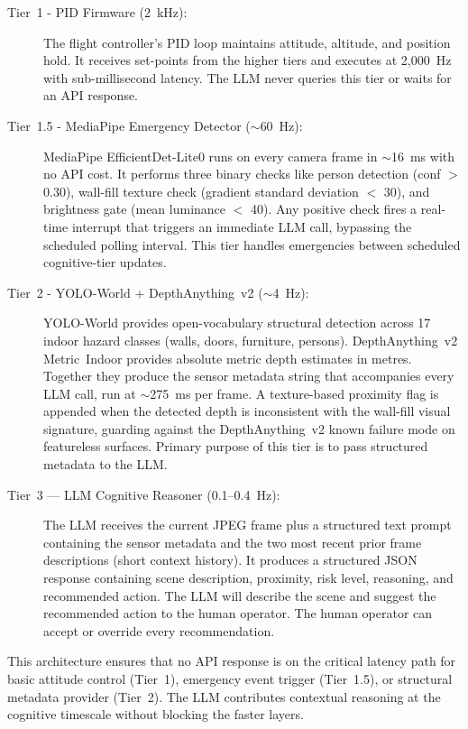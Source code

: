 \begin{description}
  \item[Tier~1 - PID Firmware (2~kHz):]
    The flight controller's PID loop maintains attitude, altitude, and position hold. 
    It receives set-points from the higher tiers and executes at 2,000~Hz with sub-millisecond latency. 
    The LLM never queries this tier or waits for an API response.
    \newpage
  \item[Tier~1.5 - MediaPipe Emergency Detector ($\sim$60~Hz):]
    MediaPipe EfficientDet-Lite0 \cite{tan2020efficientdet, lugaresi2019mediapipe} runs on every camera frame in $\sim$16~ms with no API cost. 
    It performs three binary checks like person detection (conf $>$ 0.30), wall-fill texture check (gradient standard deviation $<$ 30), and brightness gate (mean luminance $<$ 40). 
    Any positive check fires a real-time interrupt that triggers an immediate LLM call, bypassing the scheduled polling interval.
    This tier handles emergencies between scheduled cognitive-tier updates.
  \item[Tier~2 - YOLO-World + DepthAnything~v2 ($\sim$4~Hz):]
    YOLO-World \cite{cheng2024yoloworld} provides open-vocabulary structural detection across 17 indoor hazard classes (walls, doors, furniture, persons). 
    DepthAnything~v2 Metric~Indoor \cite{yang2024depthanythingv2}
    provides absolute metric depth estimates in metres. Together they produce the sensor metadata string that accompanies every LLM call, run at $\sim$275~ms per frame. 
    A texture-based proximity flag is appended when the detected depth is inconsistent with the wall-fill visual signature, guarding against the DepthAnything~v2 known failure mode on featureless surfaces.
    Primary purpose of this tier is to pass structured metadata to the LLM.
  \item[Tier~3 --- LLM Cognitive Reasoner (0.1--0.4~Hz):]
    The LLM receives the current JPEG frame plus a structured text prompt containing the sensor metadata and the two most recent prior frame descriptions (short context history). 
    It produces a structured JSON response containing scene description, proximity, risk level, reasoning, and recommended action. 
    The LLM will describe the scene and suggest the recommended action to the human operator. 
    The human operator can accept or override every recommendation.
\end{description}

This architecture ensures that no API response is on the critical latency path for basic attitude control (Tier~1), emergency event trigger (Tier~1.5), or structural metadata provider (Tier~2). 
The LLM contributes contextual reasoning at the cognitive timescale without blocking the faster layers.

